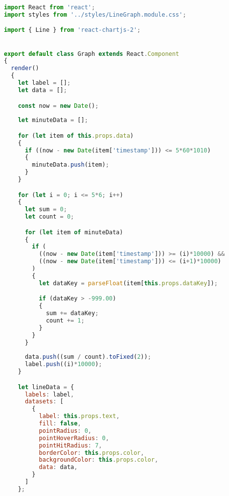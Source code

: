 \documentclass[12pt,a4paper,oneside]{book}
\begin{document}
\bigskip

\begin{lstlisting}[title={raspberrypi/ui/components/LineGraph.js}, language=JavaScript]
import React from 'react';
import styles from '../styles/LineGraph.module.css';

import { Line } from 'react-chartjs-2';


export default class Graph extends React.Component
{
  render()
  {
    let label = [];
    let data = [];

    const now = new Date();
    
    let minuteData = [];

    for (let item of this.props.data)
    {
      if ((now - new Date(item['timestamp'])) <= 5*60*1010)
      {
        minuteData.push(item);
      }
    }

    for (let i = 0; i <= 5*6; i++)
    {
      let sum = 0;
      let count = 0;

      for (let item of minuteData)
      {
        if (
          ((now - new Date(item['timestamp'])) >= (i)*10000) &&
          ((now - new Date(item['timestamp'])) <= (i+1)*10000)
        )
        {
          let dataKey = parseFloat(item[this.props.dataKey]);

          if (dataKey > -999.00)
          {
            sum += dataKey;
            count += 1;
          }
        }
      }
      
      data.push((sum / count).toFixed(2));
      label.push((i)*10000);
    }

    let lineData = {
      labels: label,
      datasets: [
        {
          label: this.props.text,
          fill: false,
          pointRadius: 0,
          pointHoverRadius: 0,
          pointHitRadius: 7,
          borderColor: this.props.color,
          backgroundColor: this.props.color,
          data: data,
        }
      ]
    };


\end{lstlisting}
\end{document}
